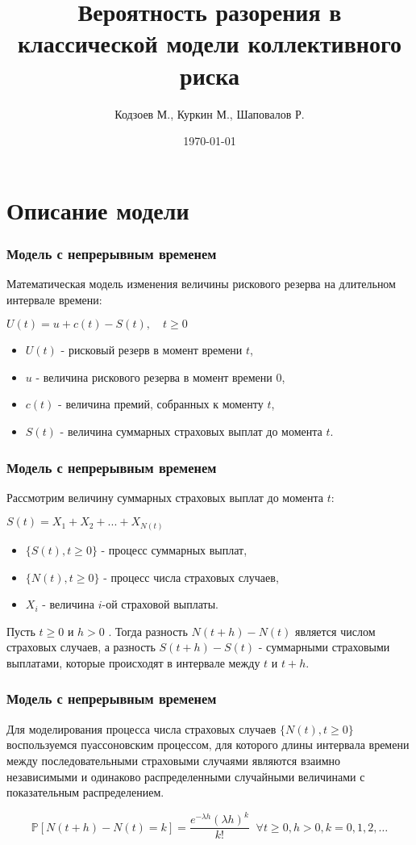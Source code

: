 \documentclass[10pt]{beamer}
\title[Модель коллективного риска]{Вероятность разорения в классической модели коллективного риска}
\author{Кодзоев М., Куркин М., Шаповалов Р.}
\institute[ВМК МГУ]
{
Московский Государственный Университет им. Ломоносова
}
\date{\today}
\begin{document}
\begin{frame}       
\titlepage
\end{frame}


\begin{frame}
\tableofcontents
\end{frame}


\section{Описание модели}
\begin{frame}
\frametitle{Модель с непрерывным временем}
\begin{flushleft}
Математическая модель изменения величины рискового резерва на длительном интервале времени:
\end{flushleft}

$U(t) = u + c(t) - S(t),\quad t \geq 0$
\begin{itemize}
    \item $U(t)$ - рисковый резерв в момент времени $t$,
    \item $u$ - величина рискового резерва в момент времени 0,
    \item $c(t)$ - величина премий, собранных к моменту $t$,
    \item $S(t)$ - величина суммарных страховых выплат до момента $t$.
\end{itemize}
\end{frame}


\begin{frame}
\frametitle{Модель с непрерывным временем}
\noindent
Рассмотрим величину суммарных страховых выплат до момента $t$:
\par\medskip
$S(t) = X_{1}+X_{2}+...+X_{N(t)}$
\begin{itemize}
    \item $\{S(t), t \geq 0\}$ - процесс суммарных выплат,
    \item $\{N(t), t \geq 0\}$ - процесс числа страховых случаев,
    \item $X_i$ - величина $i$-ой страховой выплаты.
\end{itemize}
\par\medskip \noindent
Пусть $t\geq 0$ и $h> 0$ . Тогда разность $N(t+h)-N(t)$ является числом страховых случаев, а разность $S(t+h) -S(t)$ - суммарными страховыми выплатами, которые происходят в интервале между $t$ и $t + h$.
\end{frame}


\begin{frame}
\frametitle{Модель с непрерывным временем}
\noindent
Для моделирования процесса числа страховых случаев $\{N(t), t \geq 0\}$ воспользуемся
пуассоновским процессом, для которого длины интервала времени между последовательными страховыми
случаями являются взаимно независимыми и одинаково распределенными случайными величинами
с показательным распределением.
\par\medskip \noindent
\begin{equation*}
\mathbb{P}[N(t+h)-N(t)=k] = \frac{e^{- \lambda h}(\lambda h)^{k}}{k!}
\;\; \forall t \geq 0, h > 0, k = 0, 1, 2, \dots
\end{equation*}
\end{frame}
\end{document}
